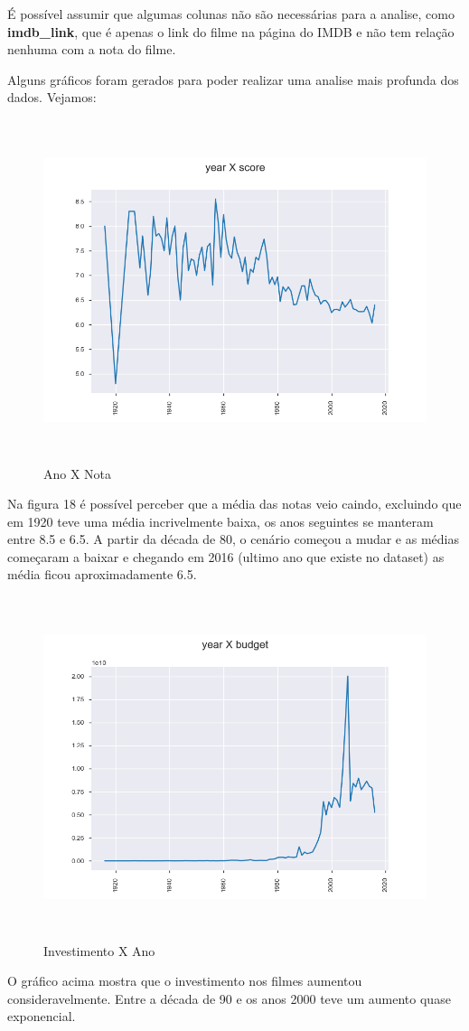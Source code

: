 É possível assumir que algumas colunas não são necessárias para a analise, como \textbf{imdb\_link}, que é apenas o link do filme na página do IMDB e não tem relação nenhuma com a nota do filme.

Alguns gráficos foram gerados para poder realizar uma analise mais profunda dos dados. Vejamos: 

\begin{figure}[H]
\centering
\includegraphics[height=10cm]{imagens/yearXscore.png}
\caption{Ano X Nota}
\label{figura 25}
\end{figure}

Na figura 18 é possível perceber que a média das notas veio caindo, excluindo que em 1920 teve uma média incrivelmente baixa, os anos seguintes se manteram entre 8.5 e 6.5. A partir da década de 80, o cenário começou a mudar e as médias começaram a baixar e chegando em 2016 (ultimo ano que existe no dataset) as média ficou aproximadamente 6.5.

\begin{figure}[H]
\centering
\includegraphics[height=10cm]{imagens/yearXbudget.png}
\caption{Investimento X Ano}
\label{figura 26}
\end{figure}
O gráfico acima mostra que o investimento nos filmes aumentou consideravelmente. Entre a década de 90 e os anos 2000 teve um aumento quase exponencial.

